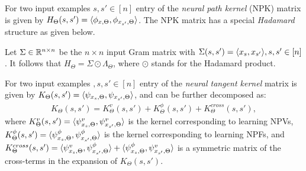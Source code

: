 For two input examples $s, s'\in[n]$ entry of the \emph{neural path kernel} (NPK) matrix is given by $H_{\Theta}(s,s')=\langle \phi_{x,\Theta},\phi_{x_{s'},\Theta}\rangle$. The NPK matrix has a special \emph{Hadamard} structure as given below.
\begin{lemma}\label{lm:npk}
Let $\Sigma \in \mathbb{R}^{n\times n}$ be the $n\times n $ input Gram matrix with  $\Sigma(s,s')=\langle x_s,x_{s'}\rangle,s,s'\in[n]$. It follows that $H_{\Theta}= \Sigma\odot\Lambda_{\Theta}$, where $\odot$ stands for the Hadamard product. 
\end{lemma}

For two input examples $,s, s'\in[n]$ entry of the \emph{neural tangent kernel} matrix is given by $K_{\Theta}(s,s')=\langle \psi_{x_s,\Theta},\psi_{x_{s'},\Theta}\rangle$, and can be further decomposed as:
\begin{align}
K_{\Theta}(s,s')=K^v_{\Theta}(s,s')+K^{\phi}_{\Theta}(s,s')+K^{cross}_{\Theta}(s,s'),
\end{align}
where $K^v_{\Theta}(s,s')=\langle \psi^v_{x_s,\Theta},\psi^v_{x_{s'},\Theta}\rangle$ is the kernel corresponding to learning NPVs, $K^{\phi}_{\Theta}(s,s')=\langle \psi^{\phi}_{x_s,\Theta},\psi^{\phi}_{x_{s'},\Theta}\rangle$ is the kernel corresponding to learning NPFs, and $K^{cross}_{\Theta}(s,s')=\langle \psi^v_{x_s,\Theta},\psi^{\phi}_{x_{s'},\Theta}\rangle+\langle \psi^{\phi}_{x_s,\Theta},\psi^{v}_{x_{s'},\Theta}\rangle$ is a symmetric matrix of the cross-terms in the expansion of $K_{\Theta}(s,s')$.

